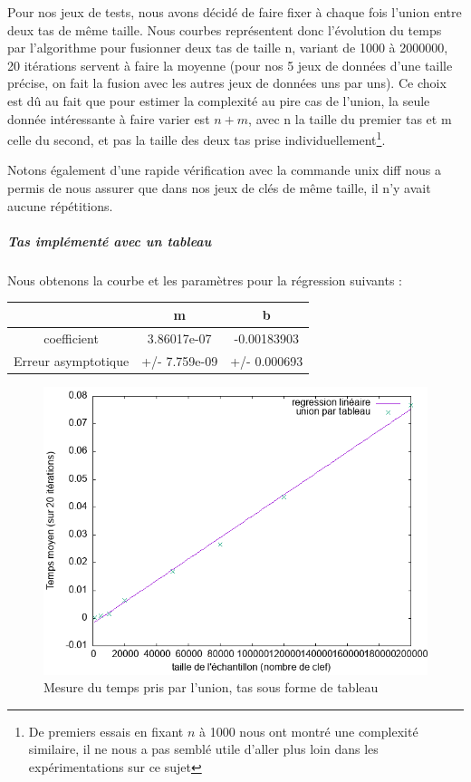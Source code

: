 \documentclass[12pt,a4paper]{article}
\begin{document}
Pour nos jeux de tests, nous avons décidé de faire fixer à chaque fois l'union entre deux tas de même taille. Nous courbes représentent donc l'évolution du temps par l'algorithme pour fusionner deux tas de taille n, variant de 1000 à 2000000,  20 itérations servent à faire la moyenne (pour nos 5 jeux de données d'une taille précise, on fait la fusion avec les autres jeux de données uns par uns). Ce choix est dû au fait que pour estimer la complexité au pire cas de l'union, la seule donnée intéressante à faire varier est $n+m$, avec n la taille du premier tas et m celle du second, et pas la taille des deux tas prise individuellement\footnote{De premiers essais en fixant $n$ à 1000 nous ont montré une complexité similaire, il ne nous a pas semblé utile d'aller plus loin dans les expérimentations sur ce sujet}.

Notons également d'une rapide vérification avec la commande unix diff nous a permis de nous assurer que dans nos jeux de clés de même taille, il n'y avait aucune répétitions.


\subparagraph{Tas implémenté avec un tableau}

Nous obtenons la courbe et les paramètres pour la régression suivants : 


\begin{center}
\begin{tabular}{|c|c|c|}
\hline
 & m & b \\
\hline
coefficient & 3.86017e-07 & -0.00183903 \\
Erreur asymptotique & +/- 7.759e-09 & +/- 0.000693  \\
\hline
\end{tabular}
\end{center}


\begin{figure}[hbtp]
\centering
\includegraphics[scale=0.4]{../Images/svg courbes pour rapport/cplxt_union_tab_regression.png}
\caption{Mesure du temps pris par l'union, tas sous forme de tableau}
\label{fig5}
\end{figure}
\end{document}
